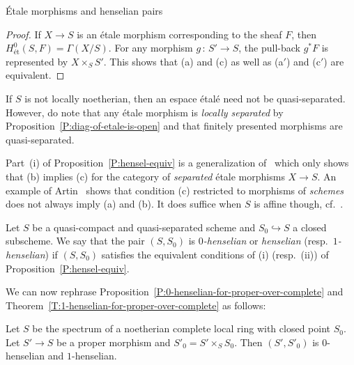 \documentclass[a4paper,twoside,11pt]{amsart}[2009/07/02] %
\newcommand{\pref}[1]{\eqref{#1}}
\newcommand{\inj}{\hookrightarrow}
\newcommand{\map}[3]{#1\,:\, #2\rightarrow #3}
\newcommand{\etale}{\'{e}tale}
\newcommand{\Etale}{\'{E}tale}
\newcommand{\metale}{\text{\'et}} %
\begin{document}
\begin{section}{\Etale{} morphisms and henselian pairs}
\begin{proof}
If $X\to S$ is an \etale{} morphism corresponding to the sheaf $F$, then
$H^0_{\metale}(S,F)=\Gamma(X/S)$. For any morphism $\map{g}{S'}{S}$, the
pull-back $g^{*}F$ is represented by $X\times_S S'$.
%
This shows that (a) and (c) as well as (a$'$) and (c$'$) are equivalent.
\end{proof}

\begin{remark}
If $S$ is not locally noetherian, then an espace \'{e}tal\'{e} need not be
quasi-separated. However, do note that any \etale{} morphism is \emph{locally
separated} by Proposition~\pref{P:diag-of-etale-is-open} and that finitely
presented morphisms are quasi-separated.
\end{remark}

\begin{remark}
Part~(i) of Proposition~\pref{P:hensel-equiv} is a generalization
of~\cite[Prop.~18.5.4]{egaIV} which only shows that (b) implies (c) for the
category of \emph{separated} \etale{} morphisms $X\to S$. An example of
Artin~\cite[Exp.~XII, Rem.~6.13]{sga4} shows that
condition (c) restricted to morphisms of \emph{schemes} does not always imply
(a) and (b). It does suffice when $S$ is affine though, cf.~\cite[Ch.~XI,
Thm.~1]{raynaud_hensel_rings}.
\end{remark}

\begin{definition}
Let $S$ be a quasi-compact and quasi-separated scheme and $S_0\inj S$ a closed
subscheme. We say that the pair $(S,S_0)$ is \emph{$0$-henselian} or
\emph{henselian} (resp.\ \emph{$1$-henselian}) if $(S,S_0)$ satisfies the
equivalent conditions of (i) (resp.\ (ii)) of Proposition~\pref{P:hensel-equiv}.
\end{definition}

We can now rephrase Proposition~\pref{P:0-henselian-for-proper-over-complete}
and Theorem~\pref{T:1-henselian-for-proper-over-complete} as follows:

\begin{theorem}
\label{T:0-1-henselian-for-proper-over-complete}
Let $S$ be the spectrum of a noetherian complete local ring with closed point
$S_0$. Let $S'\to S$ be a proper morphism and $S'_0=S'\times_S
S_0$. Then $(S',S'_0)$ is $0$-henselian and $1$-henselian.
\end{theorem}


\end{section}
\end{document}
